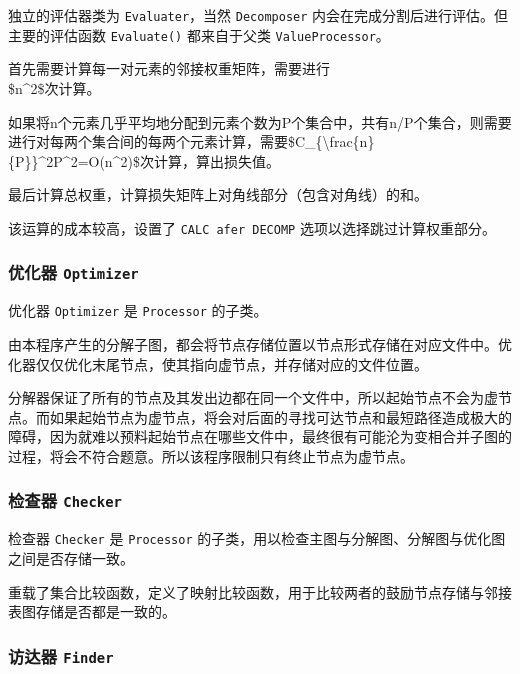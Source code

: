 \documentclass[
]{article}
\begin{document}
独立的评估器类为 \texttt{Evaluater}，当然 \texttt{Decomposer}
内会在完成分割后进行评估。但主要的评估函数 \texttt{Evaluate()}
都来自于父类 \texttt{ValueProcessor}。

首先需要计算每一对元素的邻接权重矩阵，需要进行\\
\$n\^{}2\$次计算。

如果将n个元素几乎平均地分配到元素个数为\textbar P\textbar 个集合中，共有n/\textbar P\textbar 个集合，则需要进行对每两个集合间的每两个元素计算，需要\$C\_\{\textbackslash frac\{n\}\{\textbar P\textbar\}\}\^{}2\textbar P\textbar\^{}2=O(n\^{}2)\$次计算，算出损失值。

最后计算总权重，计算损失矩阵上对角线部分（包含对角线）的和。

该运算的成本较高，设置了 \texttt{CALC\ afer\ DECOMP}
选项以选择跳过计算权重部分。

\hypertarget{header-n199}{%
\subsubsection{\texorpdfstring{优化器
\texttt{Optimizer}}{优化器 Optimizer}}\label{header-n199}}

优化器 \texttt{Optimizer} 是 \texttt{Processor} 的子类。

由本程序产生的分解子图，都会将节点存储位置以节点形式存储在对应文件中。优化器仅仅优化末尾节点，使其指向虚节点，并存储对应的文件位置。

分解器保证了所有的节点及其发出边都在同一个文件中，所以起始节点不会为虚节点。而如果起始节点为虚节点，将会对后面的寻找可达节点和最短路径造成极大的障碍，因为就难以预料起始节点在哪些文件中，最终很有可能沦为变相合并子图的过程，将会不符合题意。所以该程序限制只有终止节点为虚节点。

\hypertarget{header-n203}{%
\subsubsection{\texorpdfstring{检查器
\texttt{Checker}}{检查器 Checker}}\label{header-n203}}

检查器 \texttt{Checker} 是 \texttt{Processor}
的子类，用以检查主图与分解图、分解图与优化图之间是否存储一致。

重载了集合比较函数，定义了映射比较函数，用于比较两者的鼓励节点存储与邻接表图存储是否都是一致的。

\hypertarget{header-n206}{%
\subsubsection{\texorpdfstring{访达器
\texttt{Finder}}{访达器 Finder}}\label{header-n206}}
\end{document}
